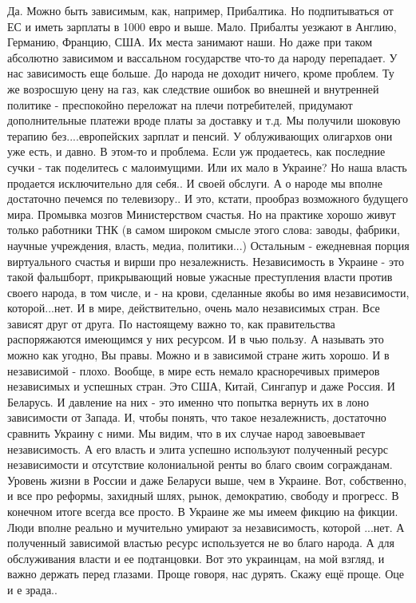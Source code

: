 \begin{itemize}
\begin{itemize}
Да. Можно быть зависимым, как, например, Прибалтика. Но подпитываться от ЕС и
иметь зарплаты в 1000 евро и выше. Мало. Прибалты уезжают в Англию, Германию,
Францию, США. Их места занимают наши. Но даже при таком абсолютно зависимом и
вассальном государстве что-то да народу перепадает. У нас зависимость еще
больше. До народа не доходит ничего, кроме проблем. Ту же возросшую цену на
газ, как следствие ошибок во внешней и внутренней политике - преспокойно
переложат на плечи потребителей, придумают дополнительные платежи вроде платы
за доставку и т.д. Мы получили шоковую терапию без....европейских зарплат и
пенсий. У облуживающих олигархов они уже есть, и давно. В этом-то и проблема.
Если уж продаетесь, как последние сучки - так поделитесь с малоимущими. Или их
мало в Украине? Но наша власть продается исключительно для себя.\Smiley[1.0][yellow]. И своей
обслуги. А о народе мы вполне достаточно печемся по телевизору.\Smiley[1.0][yellow]. И это,
кстати, прообраз возможного будущего мира. Промывка мозгов Министерством
счастья. Но на практике хорошо живут только работники ТНК (в самом широком
смысле этого слова: заводы, фабрики, научные учреждения, власть, медиа,
политики...) Остальным - ежедневная порция виртуального счастья и вирши про
незалежнисть. Независимость в Украине - это такой фальшборт, прикрывающий новые
ужасные преступления власти против своего народа, в том числе, и - на крови,
сделанные якобы во имя независимости, которой...нет. И в мире, действительно,
очень мало независимых стран. Все зависят друг от друга. По настоящему важно
то, как правительства распоряжаются имеющимся у них ресурсом. И в чью пользу. А
называть это можно как угодно, Вы правы. Можно и в зависимой стране жить
хорошо. И в независимой - плохо. Вообще, в мире есть немало красноречивых
примеров независимых и успешных стран. Это США, Китай, Сингапур и даже Россия.
И Беларусь. И давление на них - это именно что попытка вернуть их в лоно
зависимости от Запада. И, чтобы понять, что такое незалежнисть, достаточно
сравнить Украину с ними. Мы видим, что в их случае народ завоевывает
независимость. А его власть и элита успешно используют полученный ресурс
независимости и отсутствие колониальной ренты во благо своим согражданам.
Уровень жизни в России и даже Беларуси выше, чем в Украине. Вот, собственно, и
все про реформы, захидный шлях, рынок, демократию, свободу и прогресс. В
конечном итоге всегда все просто. В Украине же мы имеем фикцию на фикции. Люди
вполне реально и мучительно умирают за независимость, которой ...нет. А
полученный зависимой властью ресурс используется не во благо народа. А для
обслуживания власти и ее подтанцовки. Вот это украинцам, на мой взгляд, и важно
держать перед глазами. Проще говоря, нас дурять. Скажу ещё проще. Оце и е
зрада.\Smiley[1.0][yellow].


\end{itemize}
\end{itemize}
